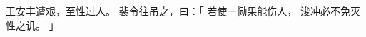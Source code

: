 
\switchcolumn*[\section{}]

王安丰遭艰，至性过人。
裴令往吊之，曰：「
    若使一恸果能伤人，
    浚冲必不免灭性之讥。
」

\switchcolumn



